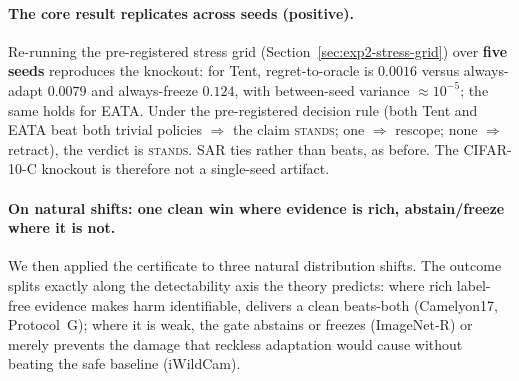 \paragraph{The core result replicates across seeds (positive).}
Re-running the pre-registered stress grid (Section~\ref{sec:exp2-stress-grid}) over
\textbf{five seeds} reproduces the knockout: for Tent, \KGA{} regret-to-oracle is
$0.0016$ versus always-adapt $0.0079$ and always-freeze $0.124$, with between-seed
variance ${\approx}10^{-5}$; the same holds for EATA.  Under the pre-registered
decision rule (both Tent and EATA beat both trivial policies $\Rightarrow$ the claim
\textsc{stands}; one $\Rightarrow$ rescope; none $\Rightarrow$ retract), the verdict
is \textsc{stands}.  SAR ties rather than beats, as before.  The CIFAR-10-C knockout
is therefore not a single-seed artifact.

\paragraph{On natural shifts: one clean win where evidence is rich, abstain/freeze where it is not.}
We then applied the certificate to three natural distribution shifts.  The outcome
splits exactly along the detectability axis the theory predicts: where rich
label-free evidence makes harm identifiable, \KGA{} delivers a clean beats-both
(Camelyon17, Protocol~G); where it is weak, the gate abstains or freezes
(ImageNet-R) or merely prevents the damage that reckless adaptation would cause
without beating the safe baseline (iWildCam).

